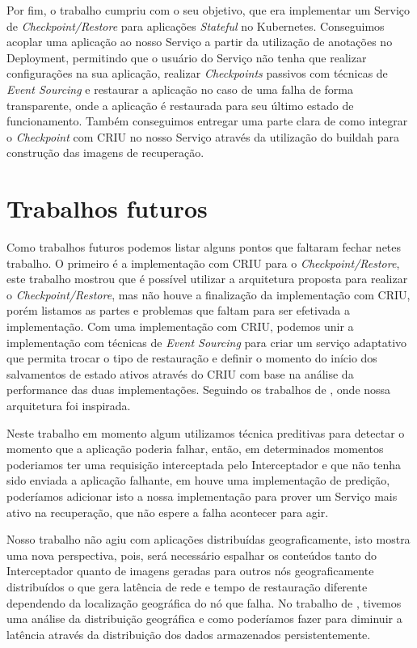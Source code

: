 	Por fim, o trabalho cumpriu com o seu objetivo, que era implementar um Serviço
	de \textit{Checkpoint/Restore} para aplicações \textit{Stateful} no Kubernetes.
	Conseguimos acoplar uma aplicação ao nosso Serviço a partir da utilização de
	anotações no Deployment, permitindo que o usuário do Serviço não tenha que
	realizar configurações na sua aplicação, realizar \textit{Checkpoints} passivos
	com técnicas de \textit{Event Sourcing} e restaurar a aplicação no caso de uma
	falha de forma transparente, onde a aplicação é restaurada para seu último estado
	de funcionamento. Também conseguimos entregar uma parte clara de como integrar o
	\textit{Checkpoint} com CRIU no nosso Serviço através da utilização do buildah
	para construção das imagens de recuperação.

\section{Trabalhos futuros}

Como trabalhos futuros podemos listar alguns pontos que faltaram fechar netes trabalho.
O primeiro é a implementação com CRIU para o \textit{Checkpoint/Restore}, este trabalho
mostrou que é possível utilizar a arquitetura proposta para realizar o
\textit{Checkpoint/Restore}, mas não houve a finalização da implementação com CRIU,
porém listamos as partes e problemas que faltam para ser efetivada a implementação. Com
uma implementação com CRIU, podemos unir a implementação com técnicas de
\textit{Event Sourcing} para criar um serviço adaptativo que permita trocar o tipo de
restauração e definir o momento do início dos salvamentos de estado ativos através do
CRIU com base na análise da performance das duas implementações. Seguindo os trabalhos
de \cite{muller2022architecture}, onde nossa arquitetura foi inspirada. 

Neste trabalho em momento algum utilizamos técnica preditivas para detectar o momento
que a aplicação poderia falhar, então, em determinados momentos poderiamos ter uma
requisição interceptada pelo Interceptador e que não tenha sido enviada a aplicação
falhante, em \cite{tran2022proactive} houve uma implementação de predição, poderíamos
adicionar isto a nossa implementação para prover um Serviço mais ativo na recuperação,
que não espere a falha acontecer para agir.

Nosso trabalho não agiu com aplicações distribuídas geograficamente, isto mostra uma
nova perspectiva, pois, será necessário espalhar os conteúdos tanto do Interceptador
quanto de imagens geradas para outros nós geograficamente distribuídos o que gera
latência de rede e tempo de restauração diferente dependendo da localização geográfica
do nó que falha. No trabalho de \cite{vayghan2021kubernetes}, tivemos uma análise da
distribuição geográfica e como poderíamos fazer para diminuir a latência através da
distribuição dos dados armazenados persistentemente.

